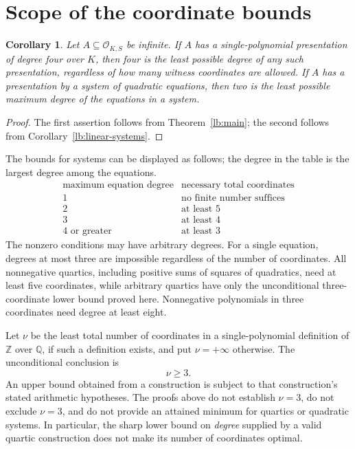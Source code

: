 \documentclass[11pt,a4paper]{article}
\newtheorem{corollary}[theorem]{Corollary}
\theoremstyle{definition}
\newcommand{\OKS}{\mathcal O_{K,S}}
\begin{document}
\section{Scope of the coordinate bounds}

\begin{corollary}\label{lb:degree-sharpness}
Let $A\subseteq\OKS$ be infinite. If $A$ has a single-polynomial
presentation of degree four over $K$, then four is the least
possible degree of any such presentation, regardless of how many
witness coordinates are allowed. If $A$ has a presentation by a
system of quadratic equations, then two is the least possible
maximum degree of the equations in a system.
\end{corollary}
\begin{proof}
The first assertion follows from Theorem~\ref{lb:main}; the second
follows from Corollary~\ref{lb:linear-systems}.
\end{proof}

The bounds for systems can be displayed as follows; the degree
in the table is the largest degree among the equations.
\[
\begin{array}{c|c}
\text{maximum equation degree}&\text{necessary total coordinates}\\
\hline
1&\text{no finite number suffices}\\
2&\text{at least }5\\
3&\text{at least }4\\
4\text{ or greater}&\text{at least }3
\end{array}
\]
The nonzero conditions may have arbitrary degrees. For a single
equation, degrees at most three are impossible regardless of the
number of coordinates. All nonnegative quartics, including
positive sums of squares of quadratics, need at least five
coordinates, while arbitrary quartics have
only the unconditional three-coordinate lower bound proved here.
Nonnegative polynomials in three coordinates need degree at
least eight.

Let $\nu$ be the least total number of coordinates in a
single-polynomial definition of $\mathbb Z$ over $\mathbb Q$,
if such a definition exists, and put $\nu=+\infty$ otherwise.
The unconditional conclusion is
\[
                              \nu\ge3.
\]
An upper bound obtained from a construction is subject to that
construction's stated arithmetic hypotheses. The proofs above
do not establish $\nu=3$, do not exclude $\nu=3$, and do not
provide an attained minimum for quartics or quadratic systems.
In particular, the sharp lower bound on \emph{degree} supplied
by a valid quartic construction does not make its number of
coordinates optimal.
\end{document}
